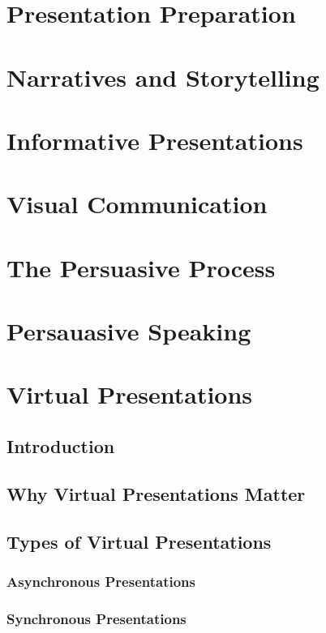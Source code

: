 \documentclass{report}
\begin{document}
\chapter{Presentation Preparation} %

\chapter{Narratives and Storytelling} %

\chapter{Informative Presentations} %

\chapter{Visual Communication} %

\chapter{The Persuasive Process} %

\chapter{Persauasive Speaking} %

\chapter{Virtual Presentations} %
    \section{Introduction}
    
    \section{Why Virtual Presentations Matter}

    \section{Types of Virtual Presentations}
        \subsection{Asynchronous Presentations}
        \subsection{Synchronous Presentations}
\end{document}

